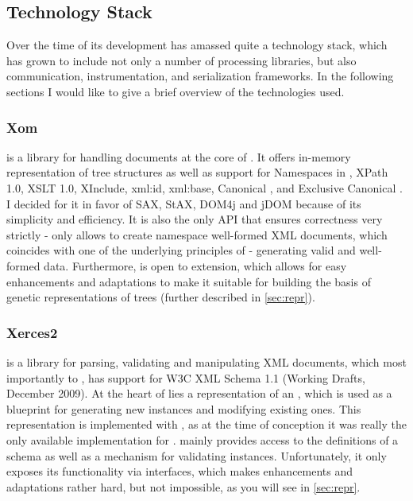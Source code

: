 \subsection{Technology Stack}
\label{sec:tech}
Over the time of its development \xmlmate has amassed quite a technology stack, 
which has grown to include not only a number of \xml processing libraries, but also communication, instrumentation, and serialization frameworks. 
In the following sections I would like to give a brief overview of the technologies used.
\subsubsection{Xom}
\xom\cite{xom} is a \java library for handling \xml documents at the core of \xmlmate. 
It offers in-memory representation of \xml tree structures as well as support for Namespaces in \xml, {\small XPath 1.0}, {\small XSLT 1.0}, 
{\small XInclude}, {\small xml:id}, {\small xml:base}, Canonical \xml, and Exclusive Canonical \xml.
I decided for it in favor of {\small SAX}, {\small StAX}, {\small DOM4j} and {\small jDOM} because of its simplicity and efficiency.
It is also the only \xml API that ensures correctness very strictly - \xom only allows to create namespace well-formed XML documents, 
which coincides with one of the underlying principles of \xmlmate{} - generating valid and well-formed data.
Furthermore, \xom is open to extension, which allows for easy enhancements and adaptations to make it suitable 
for building the basis of genetic representations of \xml trees (further described in \cref{sec:repr}).
\subsubsection{Xerces2}
\xerces\cite{xerces} is a \java library for parsing, validating and manipulating XML documents, which most importantly to \xmlmate, has support for W3C XML Schema 1.1 (Working Drafts, December 2009). 
At the heart of \xmlmate lies a representation of an \xsd, which is used as a blueprint for generating new \xml instances and modifying existing ones. 
This representation is implemented with \xerces, as at the time of conception it was really the only available \xsd implementation for \java. 
\xerces mainly provides access to the definitions of a schema as well as a mechanism for validating \xml instances.
Unfortunately, it only exposes its functionality via \java interfaces, which makes enhancements and adaptations rather hard, but not impossible, as you will see in \cref{sec:repr}.
